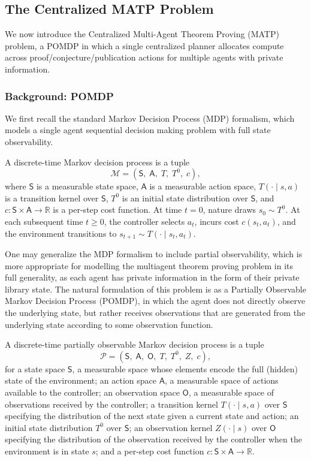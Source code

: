 \subsection{The Centralized MATP Problem}

We now introduce the Centralized Multi-Agent Theorem Proving (MATP) problem, a POMDP in which a single centralized planner allocates compute across proof/conjecture/publication actions for multiple agents with private information.

\subsubsection{Background: POMDP}
We first recall the standard Markov Decision Process (MDP) formalism, which models a single agent sequential decision making problem with full state observability.

\begin{definition}
A discrete-time Markov decision process is a tuple
\[
\mathcal{M} = (\mathsf{S},\;\mathsf{A},\;T,\;T^0,\;c),
\]
where $\mathsf{S}$ is a measurable state space, $\mathsf{A}$ is a measurable action space, $T(\cdot\mid s,a)$ is a transition kernel over $\mathsf{S}$, $T^0$ is an initial state distribution over $\mathsf{S}$, and $c:\mathsf{S}\times\mathsf{A}\to\mathbb{R}$ is a per-step cost function. At time $t=0$, nature draws $s_0\sim T^0$. At each subsequent time $t\ge 0$, the controller selects $a_t$, incurs cost $c(s_t,a_t)$, and the environment transitions to $s_{t+1}\sim T(\cdot\mid s_t,a_t)$.
\end{definition}

One may generalize the MDP formalism to include partial observability, which is more appropriate for modelling the multiagent theorem proving problem in its full generality, as each agent has private information in the form of their private library state. The natural formulation of this problem is as a Partially Observable Markov Decision Process (POMDP), in which the agent does not directly observe the underlying state, but rather receives observations that are generated from the underlying state according to some observation function.

\begin{definition}[POMDP]
A discrete-time partially observable Markov decision process is a tuple
\[
\mathcal{P} = (\mathsf{S},\; \mathsf{A},\; \mathsf{O},\; T,\; T^0,\; Z,\; c),
\]
for a state space $\mathsf{S}$, a measurable space whose elements encode the full (hidden) state of the environment; an action space $\mathsf{A}$, a measurable space of actions available to the controller; an observation space $\mathsf{O}$, a measurable space of observations received by the controller; a transition kernel $T(\cdot \mid s, a)$ over $\mathsf{S}$ specifying the distribution of the next state given a current state and action; an initial state distribution $T^0$ over $\mathsf{S}$; an observation kernel $Z(\cdot \mid s)$ over $\mathsf{O}$ specifying the distribution of the observation received by the controller when the environment is in state $s$; and a per-step cost function $c : \mathsf{S} \times \mathsf{A} \to \mathbb{R}$.
\end{definition}
 
